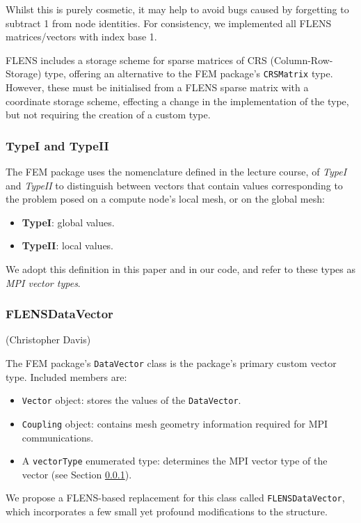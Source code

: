 Whilst this is purely cosmetic, it may help to avoid bugs caused by forgetting to subtract 1 from node identities. For consistency, we implemented all FLENS matrices/vectors with index base 1.

FLENS includes a storage scheme for sparse matrices of CRS (Column-Row-Storage) type, offering an alternative to the FEM package's \texttt{CRSMatrix} type. However, these must be initialised from a FLENS sparse matrix with a coordinate storage scheme, effecting a change in the implementation of the type, but not requiring the creation of a custom type.

\subsubsection{TypeI and TypeII}\label{subsc:typeI_II}

The FEM package uses the nomenclature defined in the lecture course, of \emph{TypeI} and \emph{TypeII} to distinguish between vectors that contain values corresponding to the problem posed on a compute node's local mesh, or on the global mesh:

\begin {itemize}
   \item \textbf{TypeI}: global values.
   \item \textbf{TypeII}: local values.
\end{itemize}

We adopt this definition in this paper and in our code, and refer to these types as \emph{MPI vector types}.

\subsubsection{FLENSDataVector} (Christopher Davis)

The FEM package's \texttt{DataVector} class is the package's primary custom vector type. Included members are:
\begin{itemize}
   \item \texttt{Vector} object: stores the values of the \texttt{DataVector}.
   \item \texttt{Coupling} object: contains mesh geometry information required for MPI communications.
   \item A \texttt{vectorType} enumerated type: determines the MPI vector type of the vector (see Section \ref{subsc:typeI_II}).
\end{itemize}

We propose a FLENS-based replacement for this class called \texttt{FLENSDataVector}, which incorporates a few small yet profound modifications to the structure.

